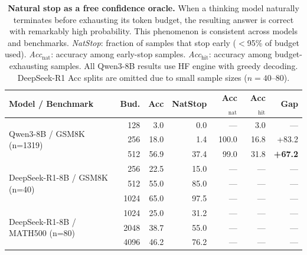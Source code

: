 \begin{table}[t]
\centering
\caption{\textbf{Natural stop as a free confidence oracle.}
When a thinking model naturally terminates before exhausting its token budget,
the resulting answer is correct with remarkably high probability.
This phenomenon is consistent across models and benchmarks.
\emph{NatStop}: fraction of samples that stop early ($<$95\% of budget used).
\emph{Acc$_\text{nat}$}: accuracy among early-stop samples.
\emph{Acc$_\text{hit}$}: accuracy among budget-exhausting samples.
All Qwen3-8B results use HF engine with greedy decoding.
DeepSeek-R1 Acc splits are omitted due to small sample sizes ($n{=}40$--$80$).}
\label{tab:natural-stop-oracle}
\small
\setlength{\tabcolsep}{3pt}
\begin{tabular}{@{}lrrrrrr@{}}
\toprule
\textbf{Model / Benchmark} & \textbf{Bud.} & \textbf{Acc} & \textbf{NatStop} & \textbf{Acc$_\text{nat}$} & \textbf{Acc$_\text{hit}$} & \textbf{Gap} \\
\midrule
\multirow{3}{*}{Qwen3-8B / GSM8K (n=1319)}
 & 128  &  3.0 &  0.0 & --- &  3.0 & --- \\
 & 256  & 18.0 &  1.4 & 100.0 & 16.8 & +83.2 \\
 & 512  & 56.9 & 37.4 & 99.0 & 31.8 & \textbf{+67.2} \\
\midrule
\multirow{3}{*}{DeepSeek-R1-8B / GSM8K (n=40)}
 & 256  & 22.5 & 15.0 & --- & --- & --- \\
 & 512  & 55.0 & 85.0 & --- & --- & --- \\
 & 1024 & 65.0 & 97.5 & --- & --- & --- \\
\midrule
\multirow{3}{*}{DeepSeek-R1-8B / MATH500 (n=80)}
 & 1024 & 25.0 & 31.2 & --- & --- & --- \\
 & 2048 & 38.7 & 55.0 & --- & --- & --- \\
 & 4096 & 46.2 & 76.2 & --- & --- & --- \\
\bottomrule
\end{tabular}
\end{table}
